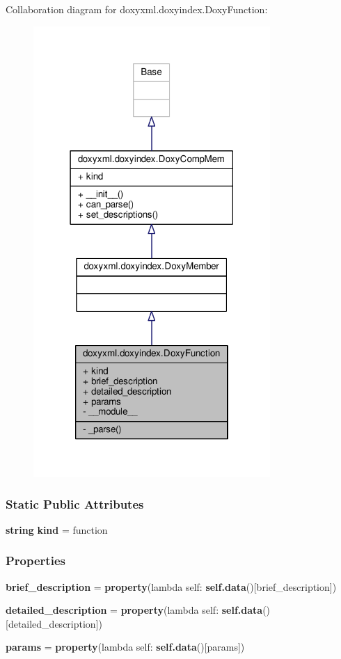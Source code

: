 Collaboration diagram for doxyxml.\+doxyindex.\+Doxy\+Function\+:
\nopagebreak
\begin{figure}[H]
\begin{center}
\leavevmode
\includegraphics[width=255pt]{dc/db3/classdoxyxml_1_1doxyindex_1_1DoxyFunction__coll__graph}
\end{center}
\end{figure}
\subsubsection*{Static Public Attributes}
\begin{DoxyCompactItemize}
\item 
{\bf string} {\bf kind} = \textquotesingle{}function\textquotesingle{}
\end{DoxyCompactItemize}
\subsubsection*{Properties}
\begin{DoxyCompactItemize}
\item 
{\bf brief\+\_\+description} = {\bf property}(lambda self\+: {\bf self.\+data}()[\textquotesingle{}brief\+\_\+description\textquotesingle{}])
\item 
{\bf detailed\+\_\+description} = {\bf property}(lambda self\+: {\bf self.\+data}()[\textquotesingle{}detailed\+\_\+description\textquotesingle{}])
\item 
{\bf params} = {\bf property}(lambda self\+: {\bf self.\+data}()[\textquotesingle{}params\textquotesingle{}])
\end{DoxyCompactItemize}
